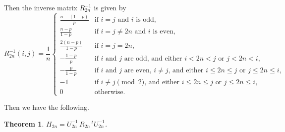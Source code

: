 \documentclass[12pt, leqno]{amsart}
\numberwithin{equation}{section}
\theoremstyle{plain}
\newtheorem{thm}{Theorem}[section]
\theoremstyle{definition}
\newcommand{\0}{\mathbf{0}}
\begin{document}
Then the inverse matrix $R_{2n}^{-1}$ is given by 
\[
R_{2n}^{-1}(i,j)=\frac{1}{n}
\begin{cases}
\frac{n-(1-p)}{p} &\text{if $i=j$ and $i$ is odd,}\\
\frac{n-p}{1-p} &\text{if $i=j \neq 2n$ and $i$ is even,}\\
\frac{2(n-p)}{1-p} &\text{if $i=j=2n$,}\\
-\frac{1-p}{p} &\text{if $i$ and $j$ are odd, and either $i<2n<j$ or $j<2n<i$,}\\
-\frac{p}{1-p} &\text{if $i$ and $j$ are even, $i\neq j$, and either $i\leq 2n\leq j$ or $j\leq 2n\leq i$,}\\
-1 &\text{if $i\not\equiv j\pmod2$, and either $i\leq 2n\leq j$ or $j\leq 2n\leq i$,}\\
0 &\text{otherwise.}
\end{cases}
\]

Then we have the following.
\begin{thm}\label{decomposition}
$H_{2n}=U^{-1}_{2n}\,R_{2n}\,{}^tU^{-1}_{2n}$. 
\end{thm}
\end{document}
